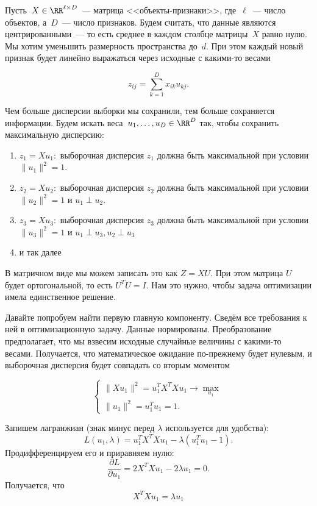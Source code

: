 \documentclass[12pt,fleqn]{article}
\begin{document}
Пусть~$X \in \RR^{\ell \times D}$~--- матрица <<объекты-признаки>>, где~$\ell$~--- число объектов, а~$D$~--- число признаков. Будем считать, что данные являются центрированными~--- то есть среднее в каждом столбце матрицы~$X$ равно нулю.  Мы хотим уменьшить размерность пространства до~$d$. При этом каждый новый признак будет линейно выражаться через исходные с какими-то весами

$$
z_{ij} = \sum_{k = 1}^{D} x_{ik} u_{kj}.
$$

Чем больше дисперсии выборки мы сохранили, тем больше сохраняется информации. Будем искать веса~$u_1, \dots, u_D \in \RR^D$ так, чтобы сохранить максимальную дисперсию: 

\begin{enumerate}
\item  $z_1 = X u_1:$ выборочная дисперсия $z_1$ должна быть максимальной при условии $\|u_1\|^2 = 1$.

\item $z_2 = X u_2:$ выборочная дисперсия $z_2$ должна быть максимальной при условии $\|u_2\|^2 = 1$ и $u_1 \perp u_2.$

\item $z_3 = X u_3:$ выборочная дисперсия $z_3$ должна быть максимальной при условии $\|u_3\|^2 = 1$ и $u_1 \perp u_3, u_2 \perp u_3$

\item и так далее
\end{enumerate}

В матричном виде мы можем записать это как $Z = XU$. При этом матрица $U$ будет ортогональной, то есть $U^TU = I$. Нам это нужно, чтобы задача оптимизации имела единственное решение. 

Давайте попробуем найти первую главную компоненту. Сведём все требования к ней в оптимизационную задачу. Данные нормированы. Преобразование предполагает, что мы взвесим исходные случайные величины с какими-то весами. Получается, что математическое ожидание по-прежнему будет нулевым, и выборочная дисперсия будет совпадать со вторым моментом

\[
    \begin{cases}
        \| X u_1 \|^2 = u_1^T X^TX u_1 \to \max_{u_1} \\
        \|u_1\|^2 = u_1^T u_1 = 1.
    \end{cases}
\]

Запишем лагранжиан (знак минус перед $\lambda$ используется для удобства):
\[
    L(u_1, \lambda)
    =
    u_1^T X^TX u_1 - \lambda (u_1^T u_1 - 1).
\]
Продифференцируем его и приравняем нулю:
\[
    \frac{\partial L}{\partial u_1}
    =
    2 X^T Xu_1 - 2 \lambda u_1
    =
    0.
\]
Получается, что 
\[
    X^T Xu_1 = \lambda u_1
\]
\end{document}
